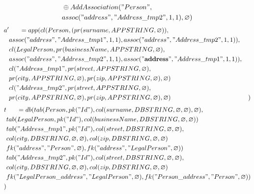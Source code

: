 \documentclass[11pt]{article}
\begin{document}
\newpage
\begin{align*}
& \oplus AddAssociation("Person", \\
& assoc("address", "Address\_tmp2", 1, 1), \varnothing) \\
\end{align*}
\hline
\begin{align*}
a' & \;\;\;\;\;\; =app(cl(Person, (pr(surname, APPSTRING, \varnothing)), \\ 
& assoc("address", "Address\_tmp1", 1, 1), assoc("address", "Address\_tmp2", 1, 1)), \\ 
& cl(LegalPerson, pr(businessName, APPSTRING, \varnothing),\\
& assoc("address", "Address\_tmp2", 1, 1), assoc(\mathbf{"address"}, "Address\_tmp1", 1, 1)), \\
& cl("Address\_tmp1", pr(street, APPSTRING, \varnothing), \\
& pr(city, APPSTRING, \varnothing), pr(zip, APPSTRING, \varnothing), \varnothing) \\
& cl("Address\_tmp2", pr(street, APPSTRING, \varnothing), \\
& pr(city, APPSTRING, \varnothing), pr(zip, APPSTRING, \varnothing), \varnothing)
& )
\end{align*}
\begin{align*}
t & \;\;\;\;\;\; =db(tab(Person, pk("Id"), col(surname, DBSTRING, \varnothing, \varnothing), \varnothing), \\
& tab(LegalPerson, pk("Id"),  col(businessName, DBSTRING, \varnothing, \varnothing)) \\
& tab("Address\_tmp1", pk("Id"), col(street, DBSTRING, \varnothing, \varnothing),\\
& col(city, DBSTRING, \varnothing, \varnothing), col(zip, DBSTRING, \varnothing, \varnothing) \\
& fk("address", "Person", \varnothing), fk("address", "LegalPerson", \varnothing))\\
& tab("Address\_tmp2", pk("Id"), col(street, DBSTRING, \varnothing, \varnothing),\\
& col(city, DBSTRING, \varnothing, \varnothing), col(zip, DBSTRING, \varnothing, \varnothing) \\
& fk("LegalPerson\_address", "LegalPerson", \varnothing), fk("Person\_address", "Person", \varnothing))\\
) 
\end{align*}
\end{document}
